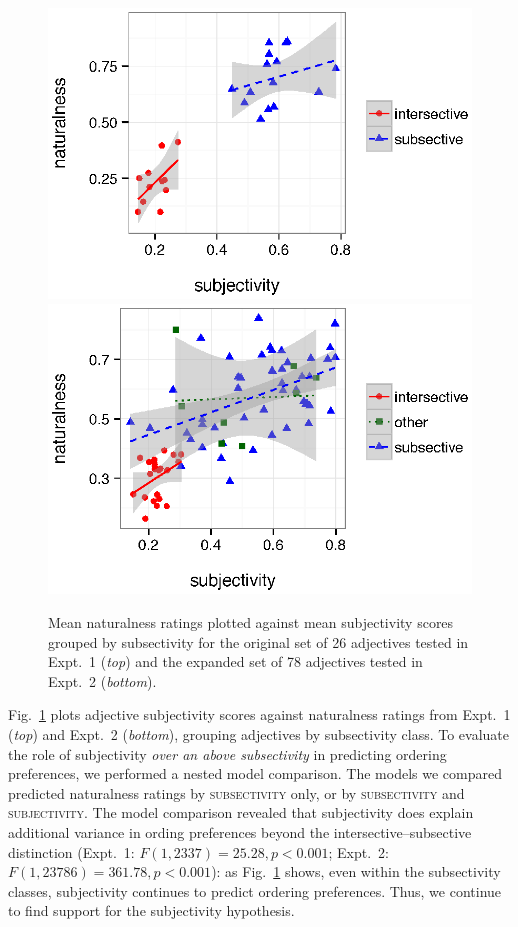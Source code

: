 \documentclass[12pt]{article}
\begin{document}
\renewcommand\thefigure{S.\arabic{figure}}
\begin{figure}
	\centering\includegraphics[width=4.5in]{plots/expt1-subjectivity-subsectivity.eps}\\\includegraphics[width=4.5in]{plots/expt3-subjectivity-subsectivity.eps}
	\caption{Mean naturalness ratings plotted against mean subjectivity scores grouped by subsectivity for the original set of 26 adjectives tested in Expt.~1 (\emph{top}) and the expanded set of 78 adjectives tested in Expt.~2 (\emph{bottom}).}\label{fig:subsectivity}
\end{figure}

Fig.~\ref{fig:subsectivity} plots adjective subjectivity scores against naturalness ratings from Expt.~1 (\emph{top}) and Expt.~2 (\emph{bottom}), grouping adjectives by subsectivity class. To evaluate the role of subjectivity \emph{over an above subsectivity} in predicting ordering preferences, we performed a nested model comparison. The models we compared predicted naturalness ratings by \textsc{subsectivity} only, or by \textsc{subsectivity} and \textsc{subjectivity}. The model comparison revealed that subjectivity does explain additional variance in ording preferences beyond the intersective--subsective distinction (Expt.~1: $F(1,2337)=25.28, p<0.001$; Expt.~2: $F(1,23786)=361.78, p<0.001$): as Fig.~\ref{fig:subsectivity} shows, even within the subsectivity classes, subjectivity continues to predict ordering preferences. Thus, we continue to find support for the subjectivity hypothesis.
\end{document}
